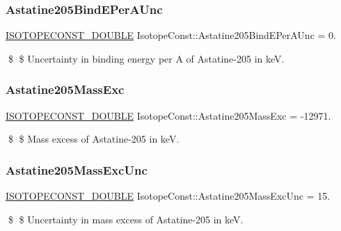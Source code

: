 \subsubsection{\texorpdfstring{Astatine205\+Bind\+E\+Per\+A\+Unc}{Astatine205BindEPerAUnc}}
{\footnotesize\ttfamily \mbox{\hyperlink{group___isotope_const-_macros_ga8f45a7272ce02c0b4c65c44636ed719a}{I\+S\+O\+T\+O\+P\+E\+C\+O\+N\+S\+T\+\_\+\+D\+O\+U\+B\+LE}} Isotope\+Const\+::\+Astatine205\+Bind\+E\+Per\+A\+Unc = 0.}

\$ \$ Uncertainty in binding energy per A of Astatine-\/205 in keV. \mbox{\label{group___isotope_const-_astatine-_at205_gaa5e24f3d618fb7c7fc83f04d65ef94aa}} 
\subsubsection{\texorpdfstring{Astatine205\+Mass\+Exc}{Astatine205MassExc}}
{\footnotesize\ttfamily \mbox{\hyperlink{group___isotope_const-_macros_ga8f45a7272ce02c0b4c65c44636ed719a}{I\+S\+O\+T\+O\+P\+E\+C\+O\+N\+S\+T\+\_\+\+D\+O\+U\+B\+LE}} Isotope\+Const\+::\+Astatine205\+Mass\+Exc = -\/12971.}

\$ \$ Mass excess of Astatine-\/205 in keV. \mbox{\label{group___isotope_const-_astatine-_at205_gad5c73447074733620c55d17b98753431}} 
\subsubsection{\texorpdfstring{Astatine205\+Mass\+Exc\+Unc}{Astatine205MassExcUnc}}
{\footnotesize\ttfamily \mbox{\hyperlink{group___isotope_const-_macros_ga8f45a7272ce02c0b4c65c44636ed719a}{I\+S\+O\+T\+O\+P\+E\+C\+O\+N\+S\+T\+\_\+\+D\+O\+U\+B\+LE}} Isotope\+Const\+::\+Astatine205\+Mass\+Exc\+Unc = 15.}

\$ \$ Uncertainty in mass excess of Astatine-\/205 in keV. \mbox{\label{group___isotope_const-_astatine-_at205_gaff2e5fe64a544f476330aad6f87ca7a6}} 
